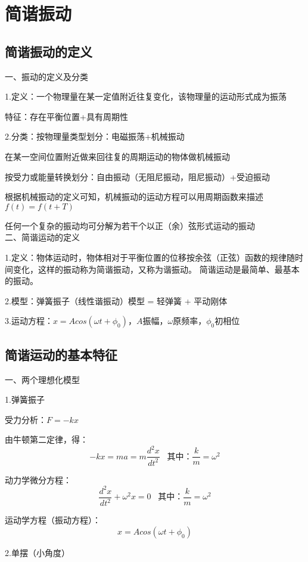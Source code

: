 \documentclass[UTF8]{article}
\begin{document}
\section{简谐振动}
\subsection{简谐振动的定义}

    一、振动的定义及分类

    1.定义：一个物理量在某一定值附近往复变化，该物理量的运动形式成为振荡

    \;\;特征：存在平衡位置+具有周期性

    2.分类：按物理量类型划分：电磁振荡+机械振动

    \;\;在某一空间位置附近做来回往复的周期运动的物体做机械振动

    \;\;按受力或能量转换划分：自由振动（无阻尼振动，阻尼振动）+受迫振动

    根据机械振动的定义可知，机械振动的运动方程可以用周期函数来描述$f(t) = f(t+T)$

    任何一个复杂的振动均可分解为若干个以正（余）弦形式运动的振动
    \\

    二、简谐运动的定义

    1.定义：物体运动时，物体相对于平衡位置的位移按余弦（正弦）函数的规律随时间变化，这样的振动称为简谐振动，又称为谐振动。
    简谐运动是最简单、最基本的振动。

    2.模型：弹簧振子（线性谐振动）模型 = 轻弹簧 + 平动刚体

    3.运动方程：$x = Acos(\omega t + \phi_0)$，$A$振幅，$\omega$原频率，$\phi_0$初相位

\subsection{简谐运动的基本特征}

    一、两个理想化模型

    1.弹簧振子

    受力分析：$F = -kx$

    由牛顿第二定律，得：
    \[-kx = ma = m\frac{d^2x}{dt^2}\;\;\;\mbox{其中：}\frac{k}{m} = \omega^2\]

    动力学微分方程：
    \[\frac{d^2x}{dt^2} + \omega^2 x = 0\;\;\;\mbox{其中：}\frac{k}{m} = \omega^2\]

    运动学方程（振动方程）：
    \[x = Acos(\omega t + \phi_0)\]

    2.单摆（小角度）
\end{document}
